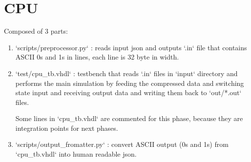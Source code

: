 \documentclass[12pt]{report}
\begin{document}
  \section{CPU}
  Composed of 3 parts:
  \begin{enumerate}
    \item `scripts/preprocessor.py` : reads input json and outputs `.in` file that contains ASCII 0s and 1s in lines, each line is 32 byte in width. 
    \item `test/cpu\_tb.vhdl` : testbench that reads `.in` files in `input` directory and performs the main simulation by feeding the compressed data and switching state input and receiving output data and writing them back to `out/*.out` files. 

    Some lines in `cpu\_tb.vhdl` are commented for this phase, because they are integration points for next phases. 
    \item `scripts/output\_fromatter.py` : convert ASCII output (0s and 1s) from `cpu\_tb.vhdl` into human readable json. 
  \end{enumerate}
\end{document}
